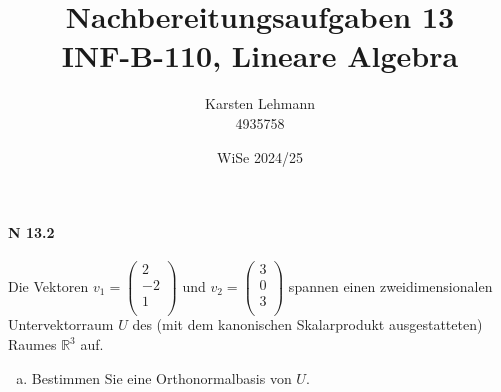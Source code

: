 \documentclass{scrreprt}
\author{Karsten Lehmann \\ 4935758}
\date{WiSe 2024/25}
\title{Nachbereitungsaufgaben 13\\INF-B-110, Lineare Algebra}
\begin{document}
\paragraph{N 13.2} Die Vektoren $v_1 = \begin{pmatrix}
  2  \\
  -2 \\
  1  \\
\end{pmatrix}$ und $v_2 = \begin{pmatrix}
  3 \\
  0 \\
  3 \\
\end{pmatrix}$ spannen einen zweidimensionalen Untervektorraum $U$ des
(mit dem kanonischen Skalarprodukt ausgestatteten) Raumes $\mathbb{R}^3$ auf.
\begin{enumerate}[(a)]
\item Bestimmen Sie eine Orthonormalbasis von $U$.


\end{enumerate}
\end{document}
